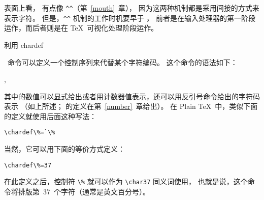 \documentclass{book}
\begin{document}
表面上看， 有点像 \verb-^^-（第~\ref{mouth}~章），
因为这两种机制都是采用间接的方式来表示字符。
但是，\verb-^^- 机制的工作时机要早于 ，
前者是在输入处理器的第一阶段运作，而后者则是在 \TeX\ 可视化处理阶段运作。

利用 \csterm chardef\par\ 命令可以定义一个控制序列来代替某个字符编码。
这个命令的语法如下：\label{chardef}
\begin{disp}
,
\end{disp}
其中的数值可以显式给出或者用计数器值表示，还可以用反引号命令给出的字符码表示%
（如上所述； 的定义在第~\ref{number}~章给出）。
在 Plain \TeX\ 中，类似下面的定义就使用后面这种写法：
\begin{verbatim}
\chardef\%=`\%
\end{verbatim}
当然，它可以用下面的等价方式定义：
\begin{verbatim}
\chardef\%=37
\end{verbatim}
在此定义之后，控制符 \verb>\%> 就可以作为 \verb>\char37> 同义词使用，
也就是说，这个命令将排版第~37~个字符（通常是英文百分号）。
\end{document}
